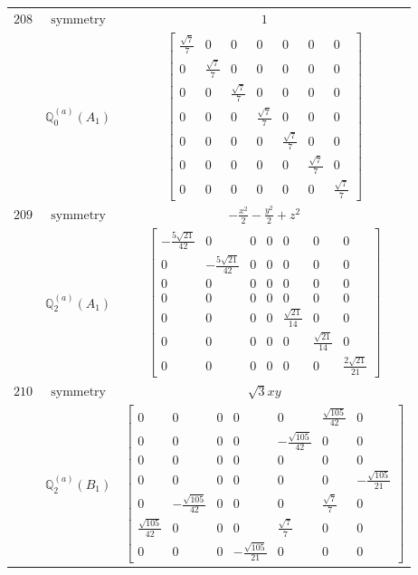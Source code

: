 \documentclass[fleqn,8pt,landscape]{jsarticle}
\begin{document}
\begin{longtable}{ccc}
$ 208 $ & $ \text{symmetry} $ & $ 1 $ \\
$  $ & $ \mathbb{Q}_{0}^{(a)}(A_{1}) $ & $ \begin{bmatrix} \frac{\sqrt{7}}{7} & 0 & 0 & 0 & 0 & 0 & 0 \\ 0 & \frac{\sqrt{7}}{7} & 0 & 0 & 0 & 0 & 0 \\ 0 & 0 & \frac{\sqrt{7}}{7} & 0 & 0 & 0 & 0 \\ 0 & 0 & 0 & \frac{\sqrt{7}}{7} & 0 & 0 & 0 \\ 0 & 0 & 0 & 0 & \frac{\sqrt{7}}{7} & 0 & 0 \\ 0 & 0 & 0 & 0 & 0 & \frac{\sqrt{7}}{7} & 0 \\ 0 & 0 & 0 & 0 & 0 & 0 & \frac{\sqrt{7}}{7} \end{bmatrix} $ \\ \hline
$ 209 $ & $ \text{symmetry} $ & $ - \frac{x^{2}}{2} - \frac{y^{2}}{2} + z^{2} $ \\
$  $ & $ \mathbb{Q}_{2}^{(a)}(A_{1}) $ & $ \begin{bmatrix} - \frac{5 \sqrt{21}}{42} & 0 & 0 & 0 & 0 & 0 & 0 \\ 0 & - \frac{5 \sqrt{21}}{42} & 0 & 0 & 0 & 0 & 0 \\ 0 & 0 & 0 & 0 & 0 & 0 & 0 \\ 0 & 0 & 0 & 0 & 0 & 0 & 0 \\ 0 & 0 & 0 & 0 & \frac{\sqrt{21}}{14} & 0 & 0 \\ 0 & 0 & 0 & 0 & 0 & \frac{\sqrt{21}}{14} & 0 \\ 0 & 0 & 0 & 0 & 0 & 0 & \frac{2 \sqrt{21}}{21} \end{bmatrix} $ \\ \hline
$ 210 $ & $ \text{symmetry} $ & $ \sqrt{3} x y $ \\
$  $ & $ \mathbb{Q}_{2}^{(a)}(B_{1}) $ & $ \begin{bmatrix} 0 & 0 & 0 & 0 & 0 & \frac{\sqrt{105}}{42} & 0 \\ 0 & 0 & 0 & 0 & - \frac{\sqrt{105}}{42} & 0 & 0 \\ 0 & 0 & 0 & 0 & 0 & 0 & 0 \\ 0 & 0 & 0 & 0 & 0 & 0 & - \frac{\sqrt{105}}{21} \\ 0 & - \frac{\sqrt{105}}{42} & 0 & 0 & 0 & \frac{\sqrt{7}}{7} & 0 \\ \frac{\sqrt{105}}{42} & 0 & 0 & 0 & \frac{\sqrt{7}}{7} & 0 & 0 \\ 0 & 0 & 0 & - \frac{\sqrt{105}}{21} & 0 & 0 & 0 \end{bmatrix} $ \\ \hline

\end{longtable}
\end{document}
